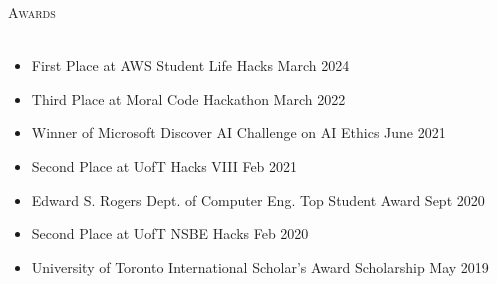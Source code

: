 \documentclass[a4paper]{article}
\newcommand{\lineunder} {
    \vspace*{-8pt} \\
    \hspace*{-18pt} \hrulefill \\
}
\newcommand{\header} [1] {
    {\hspace*{-18pt}\vspace*{6pt} \textsc{#1}}
    \vspace*{-6pt} \lineunder
}
\begin{document}
\header{Awards}
\vspace{-3mm}
\begin{itemize} \itemsep 0.5pt
	\item \begin{small} First Place at AWS Student Life Hacks \hfill March 2024 \end{small}
	\vspace{-2mm}
    \item \begin{small} Third Place at Moral Code Hackathon \hfill March 2022 \end{small}
	\vspace{-2mm}
    \item \begin{small} Winner of Microsoft Discover AI Challenge on AI Ethics \hfill June 2021 \end{small}
	\vspace{-2mm}
    \item \begin{small} Second Place at UofT Hacks VIII \hfill Feb 2021 \end{small}
    \vspace{-2mm}
    \item \begin{small} Edward S. Rogers Dept. of Computer Eng. Top Student Award \hfill Sept 2020 \end{small}
    \vspace{-2mm}
    \item \begin{small} Second Place at UofT NSBE Hacks \hfill Feb 2020 \end{small}
    \vspace{-2mm}
    \item \begin{small} University of Toronto International Scholar’s Award Scholarship \hfill May 2019 \end{small}
    \vspace{-2mm}
\end{itemize}
\end{document}
